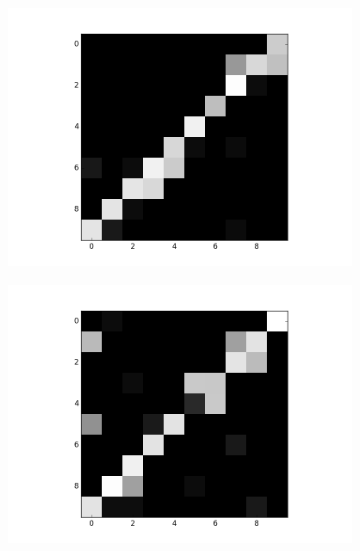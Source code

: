 \begin{figure}[h!]
\begin{subfigure}{.25\textwidth}
  		\includegraphics[width=\linewidth]{imgs/reconst/00005.png}
  		\label{fig:sub1}
	\end{subfigure}%
	\begin{subfigure}{.25\textwidth}
  		\centering
  		\includegraphics[width=\linewidth]{imgs/reconst/00007.png}
  		\label{fig:sub1}
	\end{subfigure}%
	

\end{figure}
